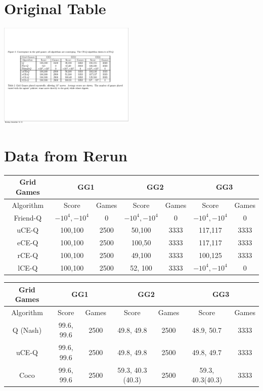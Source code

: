 \section{Original Table}
\includegraphics[height=50mm]{text/pic_CEQ.pdf}


\section{Data from Rerun}
\begin{tabular}{||c||c|c||c|c||c|c||}
	\hline
	Grid Games&  \multicolumn{2}{|c||}{GG1} &
	 \multicolumn{2}{|c||}{GG2}  & \multicolumn{2}{|c||}{GG3}  \\ \hline
	Algorithm & Score & Games & Score & Games & Score & Games \\ \hline \hline
	Friend-Q & $-10^{4},-10^{4}$ & 0 & $-10^{4},-10^{4}$ & 0 & $-10^{4},-10^{4}$ & 0 \\ \hline \hline
	uCE-Q & 100,100 & 2500 & 50,100 & 3333 & 117,117 & 3333 \\ \hline
	eCE-Q & 100,100 & 2500 & 100,50 & 3333 & 117,117 & 3333 \\ \hline
	rCE-Q & 100,100 & 2500 & 49,100 & 3333 & 100,125 & 3333 \\ \hline \hline
	lCE-Q & 100,100 & 2500 & 52, 100 & 3333 & $-10^{4},-10^{4}$ & 0 \\ \hline 
	
\end{tabular}

\vspace{10mm}

\begin{tabular}{||c||c|c||c|c||c|c||}
	\hline
	Grid Games&  \multicolumn{2}{|c||}{GG1} &
	 \multicolumn{2}{|c||}{GG2}  & \multicolumn{2}{|c||}{GG3}  \\ \hline
	Algorithm & Score & Games & Score & Games & Score & Games \\ \hline \hline
	Q (Nash) & 99.6, 99.6 & 2500 & 49.8, 49.8 & 2500 & 48.9, 50.7 & 3333 \\ \hline
	uCE-Q & 99.6, 99.6 & 2500 & 49.8, 49.8 & 2500 & 49.8, 49.7 & 3333 \\ \hline
	Coco & 99.6, 99.6 & 2500 & 59.3, 40.3 (40.3) & 2500 & 59.3, 40.3(40.3) & 3333 \\ \hline
	
\end{tabular}

